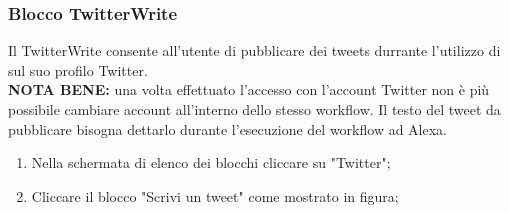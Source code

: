 \subsubsection{Blocco TwitterWrite} \label{twitterW}
Il TwitterWrite consente all'utente di pubblicare dei tweets durrante l'utilizzo di sul suo profilo Twitter. \\
\textbf{NOTA BENE:} una volta effettuato l'accesso con l'account Twitter non è più possibile cambiare account all'interno dello stesso workflow. Il testo del tweet da pubblicare bisogna dettarlo durante l'esecuzione del workflow ad Alexa.
\begin{enumerate}
	\item Nella schermata di elenco dei blocchi cliccare su "Twitter";
	\item Cliccare il blocco "Scrivi un tweet" come mostrato in figura;
	\begin{figure}[!ht]
		\centering

\end{figure}
\end{enumerate}
